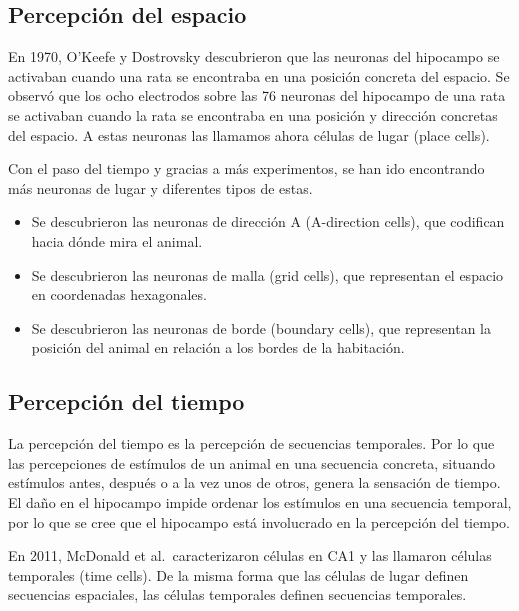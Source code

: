 \documentclass[12pt, letterpaper]{article}
\begin{document}
\subsection{Percepción del espacio}
En 1970, O'Keefe y Dostrovsky descubrieron que las neuronas del hipocampo se activaban cuando una rata se encontraba en una posición concreta del espacio. Se observó que los ocho electrodos sobre las 76 neuronas del hipocampo de una rata se activaban cuando la rata se encontraba en una posición y dirección concretas del espacio. A estas neuronas las llamamos ahora células de lugar (place cells). 

Con el paso del tiempo y gracias a más experimentos, se han ido encontrando más neuronas de lugar y diferentes tipos de estas. 
\begin{itemize}
    \item Se descubrieron las neuronas de dirección A (A-direction cells), que codifican hacia dónde mira el animal.
    \item Se descubrieron las neuronas de malla (grid cells), que representan el espacio en coordenadas hexagonales.
    \item Se descubrieron las neuronas de borde (boundary cells), que representan la posición del animal en relación a los bordes de la habitación.
\end{itemize}

\subsection{Percepción del tiempo}
La percepción del tiempo es la percepción de secuencias temporales. Por lo que las percepciones de estímulos de un animal en una secuencia concreta, situando estímulos antes, después o a la vez unos de otros, genera la sensación de tiempo. El daño en el hipocampo impide ordenar los estímulos en una secuencia temporal, por lo que se cree que el hipocampo está involucrado en la percepción del tiempo.

En 2011, McDonald et al.\ caracterizaron células en CA1 y las llamaron células temporales (time cells). De la misma forma que las células de lugar definen secuencias espaciales, las células temporales definen secuencias temporales.
\end{document}
